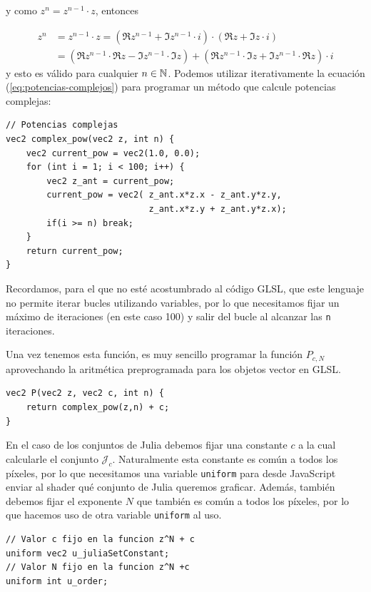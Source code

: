 y como $z^n = z^{n-1}\cdot z$, entonces

\begin{equation}
    \label{eq:potencias-complejos}
    \begin{split}
        z^n & = z^{n-1}\cdot z = (\Re z^{n-1} + \Im z^{n-1}\cdot i)\cdot(\Re z + \Im z\cdot i) \\
        & = \left(\Re z^{n-1}\cdot\Re z - \Im z^{n-1}\cdot \Im z\right) + \left(\Re z^{n-1}\cdot\Im z + \Im z^{n-1}\cdot\Re z\right)\cdot i 
    \end{split}
\end{equation}
y esto es válido para cualquier $n\in\mathbb{N}$. Podemos utilizar iterativamente la ecuación (\ref{eq:potencias-complejos}) para programar un método que calcule potencias complejas:
\begin{lstlisting}
// Potencias complejas
vec2 complex_pow(vec2 z, int n) {
    vec2 current_pow = vec2(1.0, 0.0);
    for (int i = 1; i < 100; i++) {
        vec2 z_ant = current_pow;
        current_pow = vec2( z_ant.x*z.x - z_ant.y*z.y, 
                            z_ant.x*z.y + z_ant.y*z.x);
        if(i >= n) break;
    }
    return current_pow;
}
\end{lstlisting}

Recordamos, para el que no esté acostumbrado al código GLSL, que este lenguaje no permite iterar bucles utilizando variables, por lo que necesitamos fijar un máximo de iteraciones (en este caso 100) y salir del bucle al alcanzar las \verb|n| iteraciones.

Una vez tenemos esta función, es muy sencillo programar la función $P_{c,N}$ aprovechando la aritmética preprogramada para los objetos vector en GLSL.

\begin{lstlisting}
vec2 P(vec2 z, vec2 c, int n) {
	return complex_pow(z,n) + c;
}
\end{lstlisting}

En el caso de los conjuntos de Julia debemos fijar una constante $c$ a la cual calcularle el conjunto $\mathcal{J}_c$. Naturalmente esta constante es común a todos los píxeles, por lo que necesitamos una variable \verb|uniform| para desde JavaScript enviar al shader qué conjunto de Julia queremos graficar. Además, también debemos fijar el exponente $N$ que también es común a todos los píxeles, por lo que hacemos uso de otra variable \verb|uniform| al uso.

\begin{lstlisting}
// Valor c fijo en la funcion z^N + c
uniform vec2 u_juliaSetConstant;
// Valor N fijo en la funcion z^N +c
uniform int u_order;
\end{lstlisting}

